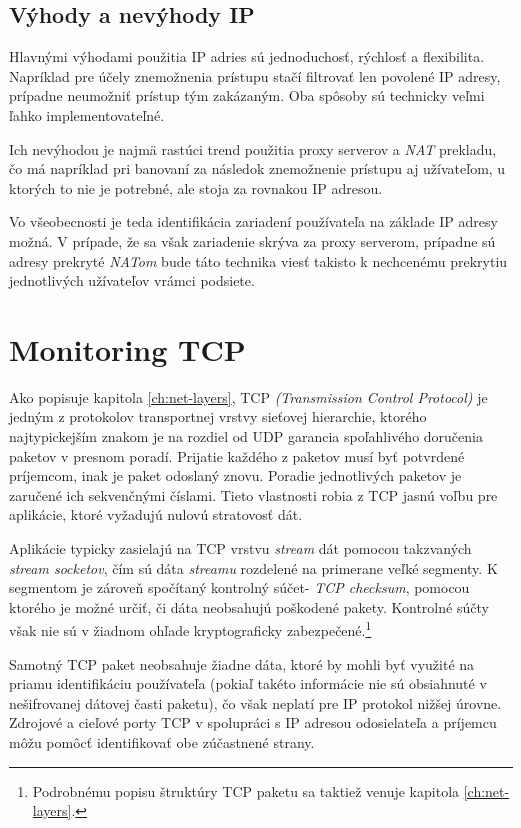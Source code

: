 \documentclass[
  digital, %
  table,   %
  lof,     %
  nolot,   %
  nocover
]{fithesis3}
\begin{document}
\subsection{Výhody a nevýhody IP}
Hlavnými výhodami použitia IP adries sú jednoduchosť, rýchlosť a flexibilita.
Napríklad pre účely znemožnenia prístupu stačí filtrovať len povolené IP
adresy, prípadne neumožniť prístup tým zakázaným. Oba spôsoby sú technicky veľmi
ľahko implementovateľné.

Ich nevýhodou je najmä rastúci trend použitia proxy serverov a \textit{NAT}
prekladu, čo má napríklad pri banovaní za následok znemožnenie prístupu aj
užívateľom, u ktorých to nie je potrebné, ale stoja za rovnakou IP adresou.

Vo všeobecnosti je teda identifikácia zariadení používateľa na základe IP
adresy možná. V prípade, že sa však zariadenie skrýva za proxy serverom,
prípadne sú adresy prekryté \textit{NATom} bude táto technika viesť takisto k
nechcenému prekrytiu jednotlivých užívateľov vrámci podsiete.

\section{Monitoring TCP}
Ako popisuje kapitola \ref{ch:net-layers}, TCP
\textit{(Transmission Control Protocol)} je jedným z protokolov transportnej
vrstvy sieťovej hierarchie, ktorého najtypickejším znakom je na rozdiel
od UDP garancia spoľahlivého doručenia paketov v presnom poradí. Prijatie
každého z paketov musí byť potvrdené príjemcom, inak je paket odoslaný znovu.
Poradie jednotlivých paketov je zaručené ich sekvenčnými číslami. Tieto 
vlastnosti robia z TCP jasnú voľbu pre aplikácie, ktoré vyžadujú nulovú
stratovosť dát. 

Aplikácie typicky zasielajú na TCP vrstvu \textit{stream} dát
pomocou takzvaných \textit{stream socketov}, čím sú dáta \textit{streamu}
rozdelené na primerane veľké segmenty. K segmentom je zároveň spočítaný
kontrolný súčet- \textit{TCP checksum}, pomocou ktorého je možné určiť, či
dáta neobsahujú poškodené pakety. Kontrolné súčty však nie sú v žiadnom ohľade
kryptograficky zabezpečené.\footnote{Podrobnému popisu štruktúry TCP paketu sa
taktiež venuje kapitola \ref{ch:net-layers}.}

Samotný TCP paket neobsahuje žiadne dáta, ktoré by mohli byť využité na priamu
identifikáciu používateľa (pokiaľ takéto informácie nie sú obsiahnuté v
nešifrovanej dátovej časti paketu), čo však neplatí pre IP protokol nižšej
úrovne. Zdrojové a cieľové porty TCP v spolupráci s IP adresou odosielateľa a
príjemcu môžu pomôcť identifikovať obe zúčastnené strany.
\end{document}
